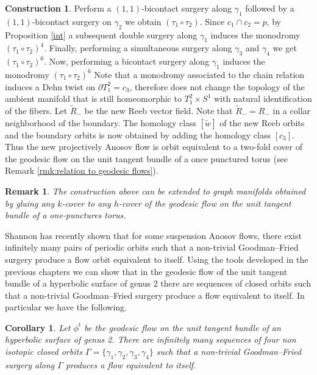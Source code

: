 \documentclass{amsart}
\newtheorem{corollary}[theorem]{Corollary}
\newtheorem{remark}[theorem]{Remark}
\theoremstyle{definition}
\newtheorem{construction}[theorem]{Construction}
\theoremstyle{remark}
\begin{document}
\begin{construction}
Perform a $(1,1)$-bicontact surgery along $\gamma_1$ followed by a $(1,1)$-bicontact surgery on $\gamma_2$ we obtain $(\tau_1\circ \tau_2)$. Since $c_1\cap c_2= p$, by Proposition \ref{int} a subsequent double surgery along $\gamma_1$ induces the monodromy $(\tau_1\circ \tau_2)^4$. Finally, performing a simultaneous surgery along $\gamma_3$ and $\gamma_4$ we get $(\tau_1\circ \tau_2)^6$. Now, performing a bicontact surgery along $\gamma_1$ induces the monodromy $(\tau_1\circ \tau_2)^6$
Note that a monodromy associated to the chain relation induces a Dehn twist on $\partial T_1^2=c_3$, therefore does not change the topology of the ambient manifold that is still homeomorphic to $T_1^2\times S^1$ with natural identification of the fibers. Let $\tilde{R}_-$ be the new Reeb vector field. Note that $\tilde{R}_-=R_-$ in a collar neighborhood of the boundary. The homology class $[\tilde{w}]$ of the new Reeb orbits and the boundary orbits is now obtained by adding the homology class $[c_3]$. Thus the new projectively Anosov flow is orbit equivalent to a two-fold cover of the geodesic flow on the unit tangent bundle of a once punctured torus (see Remark \ref{rmk:relation to geodesic flows}).


\begin{remark}
The construction above can be extended to graph manifolds obtained by gluing any $k$-cover to any $h$-cover of the geodesic flow on the unit tangent bundle of a one-punctures torus.
\end{remark}





\end{construction}

Shannon \cite{Sh24} has recently shown that for some suspension Anosov flows, there exist infinitely many pairs of periodic orbits such that a non-trivial Goodman--Fried surgery produce a flow orbit equivalent to itself. 
Using the tools developed in the previous chapters we can show that in the geodesic flow of the unit tangent bundle of a hyperbolic surface of genus 2 there are sequences of closed orbits such that a non-trivial Goodman--Fried surgery produce a flow equivalent to itself. In particular we have the following.  

 \begin{corollary}
     Let $\phi^t$ be the geodesic flow on the unit tangent bundle of an hyperbolic surface of genus 2. There are infinitely many sequences of four non isotopic closed orbits $\Gamma=\{\gamma_1,\gamma_2,\gamma_3,\gamma_4\}$ such that a non-trivial Goodman--Fried surgery along $\Gamma$ produces a flow equivalent to itself.
 \end{corollary}
\end{document}
